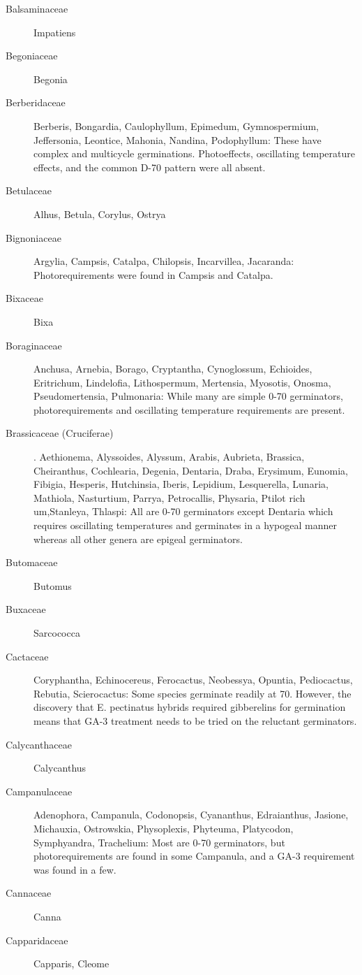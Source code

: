 \begin{description}
\item[Balsaminaceae] Impatiens
\item[Begoniaceae] Begonia
\item[Berberidaceae] Berberis, Bongardia, Caulophyllum, Epimedum,
Gymnospermium, Jeffersonia, Leontice, Mahonia, Nandina, Podophyllum: These
have complex and multicycle germinations. Photoeffects, oscillating temperature
effects, and the common D-70 pattern were all absent.
\item[Betulaceae] Alhus, Betula, Corylus, Ostrya
\item[Bignoniaceae] Argylia, Campsis, Catalpa, Chilopsis, Incarvillea,
Jacaranda: Photorequirements were found in Campsis and Catalpa.
\item[Bixaceae] Bixa
\item[Boraginaceae] Anchusa, Arnebia, Borago, Cryptantha, Cynoglossum,
Echioides, Eritrichum, Lindelofia, Lithospermum, Mertensia, Myosotis, Onosma,
Pseudomertensia, Pulmonaria: While many are simple 0-70 germinators,
photorequirements and oscillating temperature requirements are present.
\item[Brassicaceae (Cruciferae)]. Aethionema, Alyssoides, Alyssum,
Arabis, Aubrieta, Brassica, Cheiranthus, Cochlearia, Degenia, Dentaria, Draba,
Erysimum, Eunomia, Fibigia, Hesperis, Hutchinsia, Iberis, Lepidium, Lesquerella,
Lunaria, Mathiola, Nasturtium, Parrya, Petrocallis, Physaria, Ptilot rich um,Stanleya,
Thlaspi: All are 0-70 germinators except Dentaria which requires oscillating
temperatures and germinates in a hypogeal manner whereas all other genera are
epigeal germinators.
\item[Butomaceae] Butomus
\item[Buxaceae] Sarcococca
\item[Cactaceae] Coryphantha, Echinocereus, Ferocactus, Neobessya,
Opuntia, Pediocactus, Rebutia, Scierocactus: Some species germinate readily at 70.
However, the discovery that E. pectinatus hybrids required gibberelins for germination
means that GA-3 treatment needs to be tried on the reluctant germinators.
\item[Calycanthaceae] Calycanthus
\item[Campanulaceae] Adenophora, Campanula, Codonopsis, Cyananthus,
Edraianthus, Jasione, Michauxia, Ostrowskia, Physoplexis, Phyteuma, Platycodon,
Symphyandra, Trachelium: Most are 0-70 germinators, but photorequirements are
found in some Campanula, and a GA-3 requirement was found in a few.
\item[Cannaceae] Canna
\item[Capparidaceae] Capparis, Cleome

\end{description}
